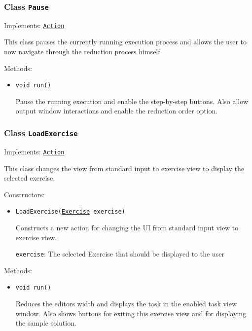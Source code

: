 \subsubsection{Class \texttt{Pause}}
\label{type:edu.kit.wavelength.client.view.action.Pause}
Implements: \texttt{\hyperref[type:edu.kit.wavelength.client.view.action.Action]{Action}}

This class pauses the currently running execution process and allows the user
 to now navigate through the reduction process himself.

Methods:
\begin{itemize}
\item \texttt{void run()}

Pause the running execution and enable the step-by-step buttons. Also allow
 output window interactions and enable the reduction order option.

\end{itemize}

\subsubsection{Class \texttt{LoadExercise}}
\label{type:edu.kit.wavelength.client.view.action.LoadExercise}
Implements: \texttt{\hyperref[type:edu.kit.wavelength.client.view.action.Action]{Action}}

This class changes the view from standard input to exercise view to display
 the selected exercise.

Constructors:
\begin{itemize}
\item \texttt{LoadExercise(\hyperref[type:edu.kit.wavelength.client.view.exercise.Exercise]{Exercise} exercise)}

Constructs a new action for changing the UI from standard input view to
 exercise view.

\texttt{exercise}: The selected Exercise that should be displayed to the user

\end{itemize}

Methods:
\begin{itemize}
\item \texttt{void run()}

Reduces the editors width and displays the task in the enabled task view
 window. Also shows buttons for exiting this exercise view and for displaying
 the sample solution.

\end{itemize}


